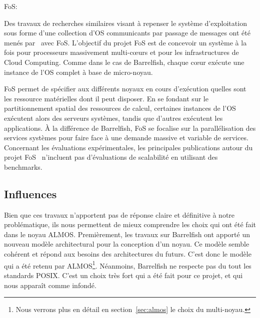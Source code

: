       \begin{paragraph}{FoS:}

        Des travaux de recherches similaires visant à repenser le système
        d’exploitation sous forme d’une collection d’OS communicants par passage
        de messages ont été menés par~\citet{wentzlaff2009factored} avec
        FoS. L’objectif du projet FoS est de concevoir un système à la fois pour
        processeurs massivement multi-c\oe urs et pour les infrastructures de
        Cloud Computing. Comme dans le cas de Barrelfish, chaque c\oe ur exécute
        une instance de l’OS complet à base de micro-noyau.


        FoS permet de spécifier aux différents noyaux en cours d'exécution
        quelles sont les ressource matérielles dont il peut disposer. En se
        fondant sur le partitionnement spatial des ressources de calcul,
        certaines instances de l’OS exécutent alors des serveurs systèmes,
        tandis que d’autres exécutent les applications. À la différence de
        Barrelfish, FoS se focalise sur la parallélisation des services systèmes
        pour faire face à une demande massive et variable de services.\\

        Concernant les évaluations expérimentales, les principales publications
        autour du projet FoS~\citep{wentzlaff2009factored,
          wentzlaff2010operating} n’incluent pas d'évaluations de scalabilité en
        utilisant des benchmarks.

      \end{paragraph}
      
    \subsection{Influences}

      Bien que ces travaux n'apportent pas de réponse claire et définitive à
      notre problématique, ils nous permettent de mieux comprendre les choix qui
      ont été fait dans le noyau ALMOS. Premièrement, les travaux sur Barrelfish
      ont apporté un nouveau modèle architectural pour la conception d'un
      noyau. Ce modèle semble cohérent et répond aux besoins des architectures
      du futurs. C'est donc le modèle qui a été retenu par ALMOS\footnote{Nous
        verrons plus en détail en section~\ref{sec:almos} le choix du
        multi-noyau.}. Néanmoins, Barrelfish ne respecte pas du tout les
      standards POSIX. C'est un choix très fort qui a été fait pour ce projet,
      et qui nous apparaît comme infondé.

